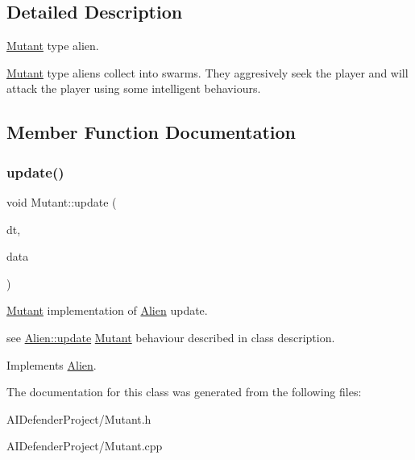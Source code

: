 \subsection{Detailed Description}
\hyperlink{class_mutant}{Mutant} type alien. 

\hyperlink{class_mutant}{Mutant} type aliens collect into swarms. They aggresively seek the player and will attack the player using some intelligent behaviours. 

\subsection{Member Function Documentation}
\mbox{\label{class_mutant_a38e6f65661b8f81e58f5e06b4d546457}} 
\subsubsection{\texorpdfstring{update()}{update()}}
{\footnotesize\ttfamily void Mutant\+::update (\begin{DoxyParamCaption}\item[{float}]{dt,  }\item[{\hyperlink{class_alien_manager}{Alien\+Manager} $\ast$}]{data }\end{DoxyParamCaption})\hspace{0.3cm}{\ttfamily [virtual]}}



\hyperlink{class_mutant}{Mutant} implementation of \hyperlink{class_alien}{Alien} update. 

see \hyperlink{class_alien_afdf9627be2ad37372174a250540dd47b}{Alien\+::update} \hyperlink{class_mutant}{Mutant} behaviour described in class description. 

Implements \hyperlink{class_alien_afdf9627be2ad37372174a250540dd47b}{Alien}.



The documentation for this class was generated from the following files\+:\begin{DoxyCompactItemize}
\item 
A\+I\+Defender\+Project/Mutant.\+h\item 
A\+I\+Defender\+Project/Mutant.\+cpp\end{DoxyCompactItemize}
